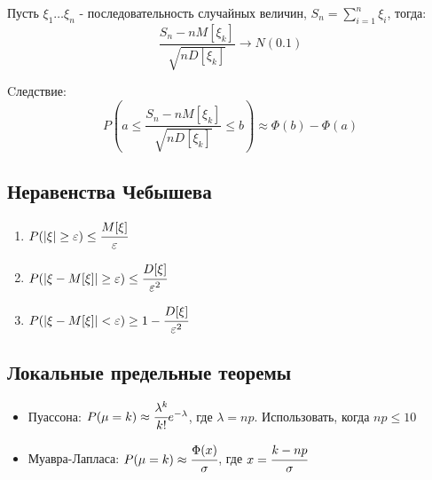 Пусть $\xi_1 \dots \xi_n$ - последовательность случайных величин, $S_n = \sum_{i=1}^n \xi_i$, тогда:
\begin{equation}
	\frac{S_n-nM[\xi_k]}{\sqrt{nD[\xi_k]}} \rightarrow N(0.1)
\end{equation}

Cледствие:
\begin{equation}
	P(a \leq \frac{S_n-nM[\xi_k]}{\sqrt{nD[\xi_k]}} \leq b) \approx \Phi(b) - \Phi(a)
\end{equation}

\subsection{Неравенства Чебышева}
\begin{enumerate}
	\item $P(|\xi| \ge \varepsilon) \le \cfrac{M[\xi]}{\varepsilon}$ 
	\item $P(|\xi - M[\xi]| \ge \varepsilon) \le \cfrac{D[\xi]}{\varepsilon^2}$
	\item $P(|\xi - M[\xi]| < \varepsilon) \ge 1 - \cfrac{D[\xi]}{\varepsilon^2}$
\end{enumerate}


\subsection{Локальные предельные теоремы}
\begin{itemize}
	\item Пуассона: $P(\mu = k) \approx \cfrac{\lambda^k}{k!}e^{-\lambda}$, где $\lambda = np$. Использовать, когда $np \le 10$
	\item Муавра-Лапласа: $P(\mu = k)\approx \cfrac{\Phi(x)}{\sigma}$, где $x = \cfrac{k-np}{\sigma}$
\end{itemize}

\clearpage